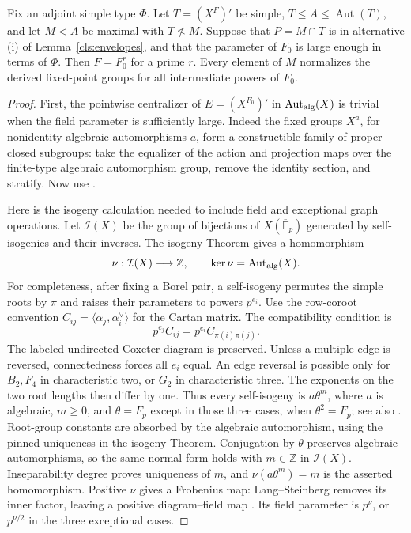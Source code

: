 \begin{lemma}\label{cls:subfields}
Fix an adjoint simple type $\Phi$.  Let $T=(X^F)'$ be simple,
$T\leq A\leq\operatorname{Aut}(T)$, and let $M<A$ be maximal with
$T\not\leq M$.  Suppose that $P=M\cap T$ is in alternative (i) of
Lemma~\ref{cls:envelopes}, and that the parameter of $F_0$ is large
enough in terms of $\Phi$.  Then $F=F_0^r$ for a prime $r$.
Every element of $M$ normalizes the derived fixed-point groups for
all intermediate powers of $F_0$.
\end{lemma}
\begin{proof}
First, the pointwise centralizer of $E=(X^{F_0})'$ in
$\operatorname{Aut}_{\rm alg}(X)$ is trivial when the field parameter
is sufficiently large.  Indeed the fixed groups $X^a$, for nonidentity
algebraic automorphisms $a$, form a constructible family of proper
closed subgroups: take the equalizer of the action and projection
maps over the finite-type algebraic automorphism group, remove the
identity section, and stratify.  Now use
\cite[Proposition~3.5]{LarsenPink2011}.

Here is the isogeny calculation needed to include field and exceptional
graph operations.  Let $\mathcal I(X)$ be the group of bijections of
$X(\overline{\mathbb F}_p)$ generated by self-isogenies and their
inverses.  The isogeny Theorem
\cite[Theorem~6.1.16(1) and Proposition~6.1.13(2)]{Conrad2014}
gives a homomorphism
\[
 \nu:\mathcal I(X)\longrightarrow\mathbb Z,
 \qquad\ker\nu=\operatorname{Aut}_{\rm alg}(X).
\]
For completeness, after fixing a Borel pair, a self-isogeny permutes
the simple roots by $\pi$ and raises their parameters to powers
$p^{e_i}$.  Use the row-coroot convention
$C_{ij}=\langle\alpha_j,\alpha_i^\vee\rangle$ for the Cartan
matrix.  The compatibility condition is
\[
 p^{e_j}C_{ij}=p^{e_i}C_{\pi(i)\pi(j)}.
\]
The labeled undirected Coxeter diagram is preserved.  Unless a
multiple edge is reversed, connectedness forces all $e_i$ equal.
An edge reversal is possible only for $B_2,F_4$ in characteristic
two, or $G_2$ in characteristic three.  The exponents on the two root
lengths then differ by one.  Thus every self-isogeny is $a\theta^m$,
where $a$ is algebraic, $m\geq0$, and $\theta=F_p$ except in those
three cases, when $\theta^2=F_p$; see also
\cite[Remark~6.2.10]{Conrad2014}.  Root-group constants are absorbed
by the algebraic automorphism, using the pinned uniqueness in the
isogeny Theorem.  Conjugation by $\theta$ preserves algebraic
automorphisms, so the same normal form holds with $m\in\mathbb Z$
in $\mathcal I(X)$.  Inseparability degree proves uniqueness of $m$,
and $\nu(a\theta^m)=m$ is the asserted homomorphism.  Positive
$\nu$ gives a Frobenius map: Lang--Steinberg removes its inner
factor, leaving a positive diagram--field map
\cite[Proposition~2.7(i), p.~435]{LiebeckSeitzClassical1998}.
Its field parameter
is $p^{\nu}$, or $p^{\nu/2}$ in the three exceptional cases.


\end{proof}
